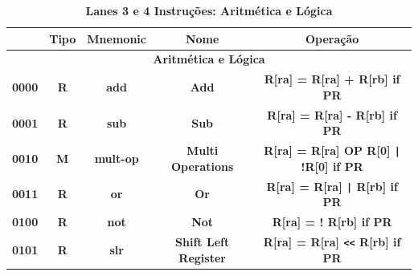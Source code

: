 \documentclass{article}
\begin{document}
    \begin{table}[H]
      \centering
      \captionsetup{labelformat=empty, skip=0pt}
      \caption{\textbf{Lanes 3 e 4 Instruções: Aritmética e Lógica}}
      \noindent\hspace*{-2.5cm}
      \begin{tabular}{|c|*{4}{c|}}
        \hline
        \rowcolor{gray!50}
        \multicolumn{1}{|c|}{\textbf{Opcode}} & \multicolumn{1}{|c|}{\textbf{Tipo}} & \multicolumn{1}{|c|}{\textbf{Mnemonic}} & \multicolumn{1}{|c|}{\textbf{Nome}}                & \multicolumn{1}{|c|}{\textbf{Operação}}                                     \\ \hline
        \multicolumn{5}{|c|}{\textbf{Aritmética e Lógica}} \\ \hline 
        \multicolumn{1}{|c|}{\textbf{0000}}   & \multicolumn{1}{c|}{\textbf{R}}     & \multicolumn{1}{c|}{\textbf{add}}       & \multicolumn{1}{c|}{\textbf{Add}}                  & \multicolumn{1}{c|}{\textbf{R[ra] = R[ra] + R[rb] if PR}}                   \\ \hline
        \multicolumn{1}{|c|}{\textbf{0001}}   & \multicolumn{1}{c|}{\textbf{R}}     & \multicolumn{1}{c|}{\textbf{sub}}       & \multicolumn{1}{c|}{\textbf{Sub}}                  & \multicolumn{1}{c|}{\textbf{R[ra] = R[ra] - R[rb] if PR}}                   \\ \hline
        \multicolumn{1}{|c|}{\textbf{0010}}   & \multicolumn{1}{c|}{\textbf{M}}     & \multicolumn{1}{c|}{\textbf{mult-op}}   & \multicolumn{1}{c|}{\textbf{Multi Operations}}     & \multicolumn{1}{c|}{\textbf{R[ra] = R[ra] OP R[0] \texttt{|} !R[0] if PR}}  \\ \hline
        \multicolumn{1}{|c|}{\textbf{0011}}   & \multicolumn{1}{c|}{\textbf{R}}     & \multicolumn{1}{c|}{\textbf{or}}        & \multicolumn{1}{c|}{\textbf{Or}}                   & \multicolumn{1}{c|}{\textbf{R[ra] = R[ra] \texttt{|} R[rb] if PR}}          \\ \hline
        \multicolumn{1}{|c|}{\textbf{0100}}   & \multicolumn{1}{c|}{\textbf{R}}     & \multicolumn{1}{c|}{\textbf{not}}       & \multicolumn{1}{c|}{\textbf{Not}}                  & \multicolumn{1}{c|}{\textbf{R[ra] = ! R[rb] if PR}}                         \\ \hline
        \multicolumn{1}{|c|}{\textbf{0101}}   & \multicolumn{1}{c|}{\textbf{R}}     & \multicolumn{1}{c|}{\textbf{slr}}       & \multicolumn{1}{c|}{\textbf{Shift Left Register}}  & \multicolumn{1}{c|}{\textbf{R[ra] = R[ra] \texttt{<<} R[rb] if PR}}         \\ \hline

\end{tabular}
\end{table}
\end{document}
